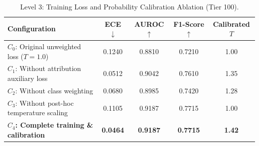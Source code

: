 \begin{table}[t]
\centering
\small
\caption{Level 3: Training Loss and Probability Calibration Ablation (Tier 100).}
\label{tab:ablation_level3_calibration}
\begin{tabular}{lcccc}
\toprule
\textbf{Configuration} & \textbf{ECE} $\downarrow$ & \textbf{AUROC} $\uparrow$ & \textbf{F1-Score} $\uparrow$ & \textbf{Calibrated $T$} \\
\midrule
$C_0$: Original unweighted loss ($T=1.0$) & 0.1240 & 0.8810 & 0.7210 & 1.00 \\
$C_1$: Without attribution auxiliary loss & 0.0512 & 0.9042 & 0.7610 & 1.35 \\
$C_2$: Without class weighting & 0.0680 & 0.8985 & 0.7420 & 1.28 \\
$C_3$: Without post-hoc temperature scaling & 0.1105 & 0.9187 & 0.7715 & 1.00 \\
\textbf{$C_4$: Complete training \& calibration} & \textbf{0.0464} & \textbf{0.9187} & \textbf{0.7715} & \textbf{1.42} \\
\bottomrule
\end{tabular}
\end{table}